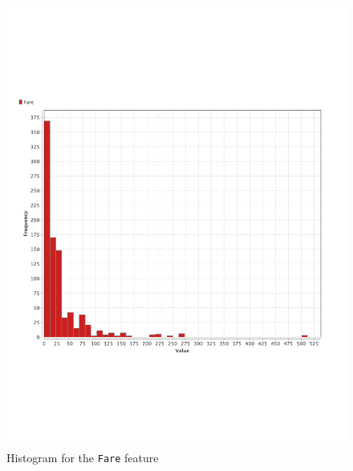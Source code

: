 \documentclass[12pt,a4paper]{article}
\begin{document}
\begin{figure}[htbp]
	\centering
	\includegraphics[width = .7\textwidth]{fare_histogram.pdf}
	\caption{Histogram for the \texttt{Fare} feature}
	\label{fig:histfare}
\end{figure}
\end{document}
